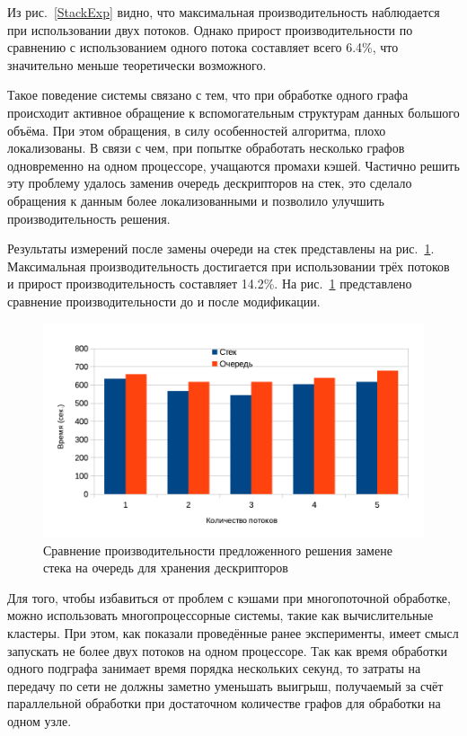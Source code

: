 Из рис.~\ref{StackExp} видно, что максимальная производительность наблюдается при использовании двух потоков. Однако прирост производительности по сравнению с использованием одного потока составляет всего 6.4\%, что значительно меньше теоретически возможного.

Такое поведение системы связано с тем, что при обработке одного графа происходит активное обращение к вспомогательным структурам данных большого объёма. При этом обращения, в силу особенностей алгоритма, плохо локализованы. В связи с чем, при попытке обработать несколько графов одновременно на одном процессоре, учащаются промахи кэшей. Частично решить эту проблему удалось заменив очередь дескрипторов на стек, это сделало обращения к данным более локализованными и позволило улучшить производительность решения. 

Результаты измерений после замены очереди на стек представлены на рис.~\ref{StackExp2}. Максимальная производительность достигается при использовании трёх потоков и прирост производительность составляет 14.2\%. На рис.~\ref{StackExp2} представлено сравнение производительности до и после модификации.



\begin{figure}
 \centering
 \includegraphics[width=\textwidth]{Ragozina/pics/StackVSQueue.pdf}
 \caption{Сравнение производительности предложенного решения замене стека на очередь для хранения дескрипторов }
 \label{StackExp2}
\end{figure}

Для того, чтобы избавиться от проблем с кэшами при многопоточной обработке, можно использовать многопроцессорные системы, такие как вычислительные кластеры. При этом, как показали проведённые ранее эксперименты, имеет смысл запускать не более двух потоков на одном процессоре. Так как время обработки одного подграфа занимает время порядка нескольких секунд, то затраты на передачу по сети не должны заметно уменьшать выигрыш, получаемый за счёт параллельной обработки при достаточном количестве графов для обработки на одном узле.  

